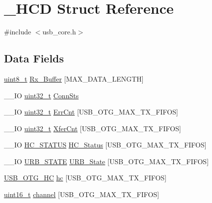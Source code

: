 \hypertarget{struct___h_c_d}{\section{\-\_\-\-H\-C\-D Struct Reference}
\label{struct___h_c_d}
}


{\ttfamily \#include $<$usb\-\_\-core.\-h$>$}

\subsection*{Data Fields}
\begin{DoxyCompactItemize}
\item 
\hyperlink{stdint_8h_aba7bc1797add20fe3efdf37ced1182c5}{uint8\-\_\-t} \hyperlink{struct___h_c_d_a9b886e4a5ff9ac8e0ab66c36d4fa03b4}{Rx\-\_\-\-Buffer} \mbox{[}M\-A\-X\-\_\-\-D\-A\-T\-A\-\_\-\-L\-E\-N\-G\-T\-H\mbox{]}
\item 
\-\_\-\-\_\-\-I\-O \hyperlink{stdint_8h_a435d1572bf3f880d55459d9805097f62}{uint32\-\_\-t} \hyperlink{struct___h_c_d_adcd85817e79354756642ab97f9420332}{Conn\-Sts}
\item 
\-\_\-\-\_\-\-I\-O \hyperlink{stdint_8h_a435d1572bf3f880d55459d9805097f62}{uint32\-\_\-t} \hyperlink{struct___h_c_d_a6c115973924bf07cf5782105e4d4e7ef}{Err\-Cnt} \mbox{[}U\-S\-B\-\_\-\-O\-T\-G\-\_\-\-M\-A\-X\-\_\-\-T\-X\-\_\-\-F\-I\-F\-O\-S\mbox{]}
\item 
\-\_\-\-\_\-\-I\-O \hyperlink{stdint_8h_a435d1572bf3f880d55459d9805097f62}{uint32\-\_\-t} \hyperlink{struct___h_c_d_aad8cc80809ba0c9ca4a26d00cf9af5a1}{Xfer\-Cnt} \mbox{[}U\-S\-B\-\_\-\-O\-T\-G\-\_\-\-M\-A\-X\-\_\-\-T\-X\-\_\-\-F\-I\-F\-O\-S\mbox{]}
\item 
\-\_\-\-\_\-\-I\-O \hyperlink{group___u_s_b___c_o_r_e___exported___types_gaa3b5cdc33c598d3e76e186f3b6ae5cd3}{H\-C\-\_\-\-S\-T\-A\-T\-U\-S} \hyperlink{struct___h_c_d_afff8e4f7048e5b3fa054873aa28ac376}{H\-C\-\_\-\-Status} \mbox{[}U\-S\-B\-\_\-\-O\-T\-G\-\_\-\-M\-A\-X\-\_\-\-T\-X\-\_\-\-F\-I\-F\-O\-S\mbox{]}
\item 
\-\_\-\-\_\-\-I\-O \hyperlink{group___u_s_b___c_o_r_e___exported___types_ga05286e84306322d89383fc7b6853e717}{U\-R\-B\-\_\-\-S\-T\-A\-T\-E} \hyperlink{struct___h_c_d_a6700b3ad3fceafe3fec9008502fe8885}{U\-R\-B\-\_\-\-State} \mbox{[}U\-S\-B\-\_\-\-O\-T\-G\-\_\-\-M\-A\-X\-\_\-\-T\-X\-\_\-\-F\-I\-F\-O\-S\mbox{]}
\item 
\hyperlink{group___u_s_b___c_o_r_e___exported___types_ga9025487237e4d60a4406daecca98cee0}{U\-S\-B\-\_\-\-O\-T\-G\-\_\-\-H\-C} \hyperlink{struct___h_c_d_aa0dbf880808375467d4cc697b51cea71}{hc} \mbox{[}U\-S\-B\-\_\-\-O\-T\-G\-\_\-\-M\-A\-X\-\_\-\-T\-X\-\_\-\-F\-I\-F\-O\-S\mbox{]}
\item 
\hyperlink{stdint_8h_a273cf69d639a59973b6019625df33e30}{uint16\-\_\-t} \hyperlink{struct___h_c_d_ae40b6fed9fa4953125333783c0424da8}{channel} \mbox{[}U\-S\-B\-\_\-\-O\-T\-G\-\_\-\-M\-A\-X\-\_\-\-T\-X\-\_\-\-F\-I\-F\-O\-S\mbox{]}
\end{DoxyCompactItemize}


